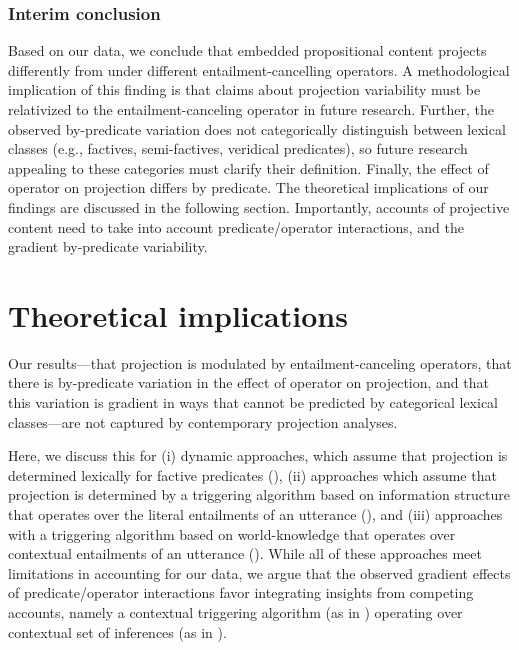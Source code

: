 \documentclass[a4paper,12pt,twoside]{article}
\begin{document}
		\subsubsection{Interim conclusion}

			Based on our data, we conclude that embedded propositional content projects differently from under different entailment-cancelling operators. A methodological implication of this finding is that claims about projection variability must be relativized to the entailment-canceling operator in future research.
			Further, the observed by-predicate variation does not categorically distinguish between lexical classes (e.g., factives, semi-factives, veridical predicates), so future research appealing to these categories must clarify their definition.
			Finally, the effect of operator on projection differs by predicate. The theoretical implications of our findings are discussed in the following section. Importantly, accounts of projective content need to take into account predicate/operator interactions, and the gradient by-predicate variability.


\section{Theoretical implications}
	Our results---that projection is modulated by entailment-canceling operators, that there is by-predicate variation in the effect of operator on projection, and that this variation is gradient in ways that cannot be predicted by categorical lexical classes---are not captured by contemporary projection analyses.
		
		Here, we discuss this for (i) dynamic approaches, which assume that projection is determined lexically for factive predicates (\citealt{heim_projection_1983,heim_presupposition_1992,van_der_sandt_presupposition_1992}), (ii) approaches which assume that projection is determined by a triggering algorithm based on information structure that operates over the literal entailments of an utterance (\citealt{abrusan_predicting_2011,simons_best_2017}), and (iii) approaches with a triggering algorithm based on world-knowledge that operates over contextual entailments of an utterance (\citealt{schlenker_triggering_2021}). While all of these approaches meet limitations in accounting for our data, we argue that the observed gradient effects of predicate/operator interactions favor integrating insights from competing accounts, namely a contextual triggering algorithm (as in \citealt{abrusan_predicting_2011,simons_best_2017}) operating over contextual set of inferences (as in \citealt{schlenker_triggering_2021}).
	
\end{document}
